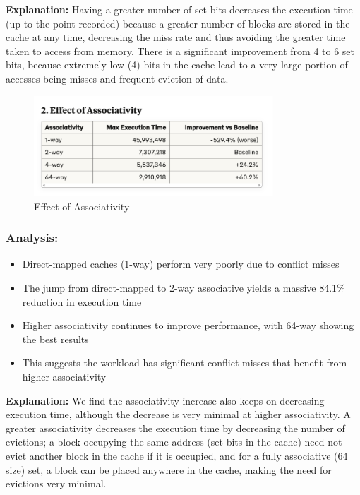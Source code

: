 \documentclass[12pt,a4paper]{article}
\begin{document}
\textbf{Explanation:} Having a greater number of set bits decreases the execution time (up to the point recorded) because a greater number of blocks are stored in the cache at any time, decreasing the miss rate and thus avoiding the greater time taken to access from memory. There is a significant improvement from 4 to 6 set bits, because extremely low (4) bits in the cache lead to a very large portion of accesses being misses and frequent eviction of data.

\begin{figure}[H]
    \centering
    \includegraphics[width=0.8\textwidth]{image5_s3.png}
    \caption{Effect of Associativity}
    \label{fig:associativity}
\end{figure}

\subsubsection*{Analysis:}
\begin{itemize}
    \item Direct-mapped caches (1-way) perform very poorly due to conflict misses
    \item The jump from direct-mapped to 2-way associative yields a massive 84.1\% reduction in execution time
    \item Higher associativity continues to improve performance, with 64-way showing the best results
    \item This suggests the workload has significant conflict misses that benefit from higher associativity
\end{itemize}

\textbf{Explanation:} We find the associativity increase also keeps on decreasing execution time, although the decrease is very minimal at higher associativity. A greater associativity decreases the execution time by decreasing the number of evictions; a block occupying the same address (set bits in the cache) need not evict another block in the cache if it is occupied, and for a fully associative (64 size) set, a block can be placed anywhere in the cache, making the need for evictions very minimal.
\end{document}
